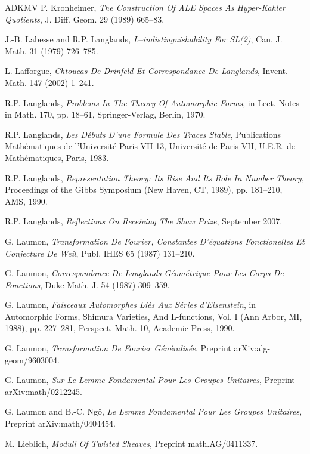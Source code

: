 \begin{thebibliography}{ADKMV}
 P. Kronheimer, \emph{The Construction Of ALE Spaces As Hyper-Kahler Quotients}, J. Diff. Geom. 29 (1989) 665--83.

 J.-B. Labesse and R.P. Langlands, \emph{L--indistinguishability For SL(2)}, Can. J. Math. 31 (1979) 726--785.

 L. Lafforgue, \emph{Chtoucas De Drinfeld Et Correspondance De Langlands}, Invent. Math. 147 (2002) 1--241.

 R.P. Langlands, \emph{Problems In The Theory Of Automorphic Forms}, in Lect. Notes in Math. 170, pp. 18--61, Springer-Verlag, Berlin, 1970.

 R.P. Langlands, \emph{Les D\'ebuts D'une Formule Des Traces Stable}, Publications Math\'ematiques de l'Universit\'e Paris VII 13, Universit\'e de Paris VII, U.E.R. de Math\'ematiques, Paris, 1983.

 R.P. Langlands, \emph{Representation Theory: Its Rise And Its Role In Number Theory}, Proceedings of the Gibbs Symposium (New Haven, CT, 1989), pp. 181--210, AMS, 1990.

 R.P. Langlands, \emph{Reflections On Receiving The Shaw Prize}, September 2007.

 G. Laumon, \emph{Transformation De Fourier, Constantes D'\'equations Fonctionelles Et Conjecture De Weil}, Publ. IHES 65 (1987) 131--210.

 G. Laumon, \emph{Correspondance De Langlands G\'eom\'etrique Pour Les Corps De Fonctions}, Duke Math. J. 54 (1987) 309--359.

 G. Laumon, \emph{Faisceaux Automorphes Li\'es Aux S\'eries d'Eisenstein}, in Automorphic Forms, Shimura Varieties, And L-functions, Vol. I (Ann Arbor, MI, 1988), pp. 227--281, Perspect. Math. 10, Academic Press, 1990.

 G. Laumon, \emph{Transformation De Fourier G\'en\'eralis\'ee}, Preprint arXiv:alg-geom/9603004.

 G. Laumon, \emph{Sur Le Lemme Fondamental Pour Les Groupes Unitaires}, Preprint arXiv:math/0212245.

 G. Laumon and B.-C. Ng\^o, \emph{Le Lemme Fondamental Pour Les Groupes Unitaires}, Preprint arXiv:math/0404454.

 M. Lieblich, \emph{Moduli Of Twisted Sheaves}, Preprint math.AG/0411337.


\end{thebibliography}
